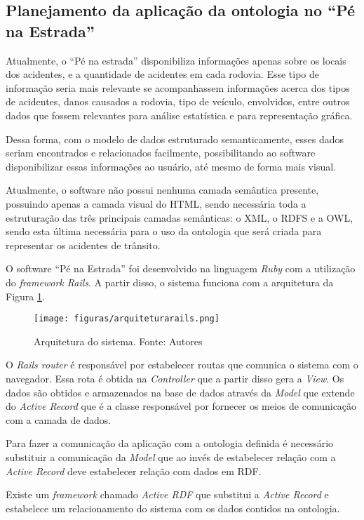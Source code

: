\subsection{Planejamento da aplicação da ontologia no ``Pé na Estrada''}

Atualmente, o “Pé na estrada” disponibiliza informações apenas sobre os locais dos
acidentes, e a quantidade de acidentes em cada rodovia. Esse tipo de informação seria mais
relevante se acompanhassem informações acerca dos tipos de acidentes, danos causados a
rodovia, tipo de veículo, envolvidos, entre outros dados que fossem relevantes para análise
estatística e para representação gráfica.

Dessa forma, com o modelo de dados estruturado semanticamente, esses dados seriam
encontrados e relacionados facilmente, possibilitando ao software disponibilizar essas
informações ao usuário, até mesmo de forma mais visual.

Atualmente, o software não possui nenhuma camada semântica presente, possuindo
apenas a camada visual do HTML, sendo necessária toda a estruturação das três principais
camadas semânticas: o XML, o RDFS e a OWL, sendo esta última necessária para o uso da
ontologia que será criada para representar os acidentes de trânsito.

O software ``Pé na Estrada'' foi desenvolvido na linguagem \textit{Ruby} com a utilização do \textit{framework Rails}. 
A partir disso, o sistema funciona com a arquitetura da Figura \ref{fig:arquitetura}.

\begin{figure}[!htb]
 \centering
 \texttt{[image: figuras/arquiteturarails.png]}
 \caption[Arquitetura do \textit{software} “Pé na Estrada”]{Arquitetura do sistema. Fonte: Autores}
 \label{fig:arquitetura}

\end{figure}

O \textit{Rails router} é responsável por estabelecer routas que comunica o sistema com o navegador. Essa rota é obtida
na \textit{Controller} que a partir disso gera a \textit{View}. Os dados são obtidos e armazenados na base de dados através da \textit{Model}
que extende do \textit{Active Record} que é a classe responsável por fornecer os meios de comunicação com a camada de dados.

Para fazer a comunicação da aplicação com a ontologia definida é necessário substituir a comunicação da \textit{Model} que ao invés
de estabelecer relação com a \textit{Active Record} deve estabelecer relação com dados em RDF.

Existe um \textit{framework} chamado \textit{Active RDF} \footnotemark[1] que substitui a \textit{Active Record} e estabelece um relacionamento
do sistema com os dados contidos na ontologia. 

